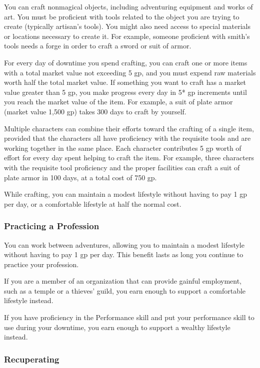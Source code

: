 You can craft nonmagical objects, including adventuring equipment and works of art. You must be proficient with tools related to the object you are trying to create (typically artisan's tools). You might also need access to special materials or locations necessary to create it. For example, someone proficient with smith's tools needs a forge in order to craft a sword or suit of armor.

For every day of downtime you spend crafting, you can craft one or more items with a total market value not exceeding 5 gp, and you must expend raw materials worth half the total market value. If something you want to craft has a market value greater than 5 gp, you make progress every day in 5* gp increments until you reach the market value of the item. For example, a suit of plate armor (market value 1,500 gp) takes 300 days to craft by yourself.

Multiple characters can combine their efforts toward the crafting of a single item, provided that the characters all have proficiency with the requisite tools and are working together in the same place. Each character contributes 5 gp worth of effort for every day spent helping to craft the item. For example, three characters with the requisite tool proficiency and the proper facilities can craft a suit of plate armor in 100 days, at a total cost of 750 gp.

While crafting, you can maintain a modest lifestyle without having to pay 1 gp per day, or a comfortable lifestyle at half the normal cost.

\subsubsection{Practicing a Profession}

You can work between adventures, allowing you to maintain a modest lifestyle without having to pay 1 gp per day. This benefit lasts as long you continue to practice your profession.

If you are a member of an organization that can provide gainful employment, such as a temple or a thieves' guild, you earn enough to support a comfortable lifestyle instead.

If you have proficiency in the Performance skill and put your performance skill to use during your downtime, you earn enough to support a wealthy lifestyle instead.

\subsubsection{Recuperating}

